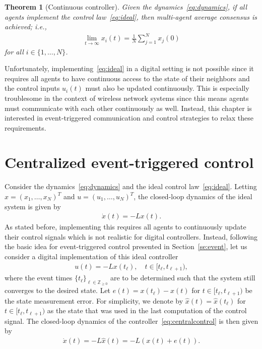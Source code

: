 \documentclass[]{book}
\newtheorem{theorem}{Theorem}[section]
\newcommand{\integernonnegative}{\mathbb{Z}_{\ge 0}}
\newcommand{\until}[1]{\{1,\dots, #1\}}
\begin{document}
\begin{theorem}[Continuous controller]\label{th:main}
  Given the dynamics~\eqref{eq:dynamics}, if all agents implement the
  control law~\eqref{eq:ideal}, then multi-agent average consensus is
  achieved; i.e.,
  \begin{align}\label{eq:averageconsensus}
    \lim_{t \rightarrow \infty} x_i(t) = \frac{1}{N} \sum_{j=1}^N
    x_j(0)
  \end{align}
  for all $i \in \until{N}$.
\end{theorem}

Unfortunately, implementing~\eqref{eq:ideal} in a digital setting is
not possible since it requires all agents to have continuous access to
the state of their neighbors and the control inputs $u_i(t)$ must also
be updated continuously. This is especially troublesome in the context
of wireless network systems since this means agents must communicate
with each other continuously as well. Instead, this chapter is
interested in event-triggered communication and control strategies to
relax these requirements.


\section{Centralized event-triggered control}

Consider the dynamics~\eqref{eq:dynamics} and the ideal control
law~\eqref{eq:ideal}.  Letting $x = (x_1, \dots, x_N)^T$ and $u =
(u_1, \dots, u_N)^T$, the closed-loop dynamics of the ideal system is
given by
\begin{align}\label{eq:idealfull}
  \dot{x}(t) = -Lx(t) .
\end{align}
As stated before, implementing this requires all agents to
continuously update their control signals which is not realistic for
digital controllers. Instead, following the basic idea for event-triggered
control presented in Section~\ref{se:event}, let us consider a digital implementation
of this ideal controller
\begin{align}\label{eq:centralcontrol}
  u(t) = -Lx(t_\ell), \quad t \in [t_\ell, t_{\ell+1} ),
\end{align}
where the event times $\{ t_\ell \}_{\ell \in \integernonnegative}$
are to be determined such that the system still converges to the
desired state. Let $e(t) = x(t_\ell) - x(t)$ for $t \in [t_\ell,
t_{\ell+1})$ be the state measurement error.  For simplicity, we
denote by $\hat{x}(t) = \hat{x}(t_\ell)$ for $t \in [t_\ell,
t_{\ell+1})$ as the state that was used in the last computation of the
control signal.  The closed-loop dynamics of the
controller~\eqref{eq:centralcontrol} is then given by
\begin{align}\label{eq:centraldynamics}
  \dot{x}(t) = -L \hat{x}(t) = -L( x(t) + e(t) ).
\end{align}
\end{document}
